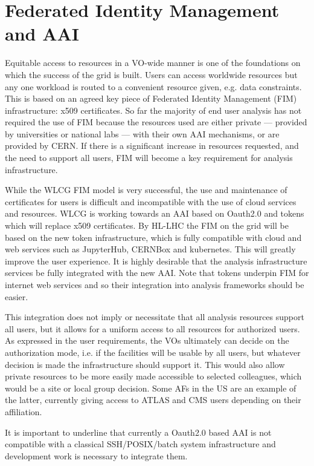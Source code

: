 \section{Federated Identity Management and AAI}
\label{aai}

Equitable access to resources in a VO-wide manner is one of the foundations on which the success of the grid is built. Users can access worldwide resources but any one workload is routed to a convenient resource given, e.g. data constraints. This is based on an agreed key piece of Federated Identity Management (FIM) infrastructure: x509 certificates. So far the majority of end user analysis has not required the use of FIM because the resources used are either private ---  provided by universities or national labs --- with their own AAI mechanisms, or are provided by CERN. If there is a significant increase in resources requested, and the need to support all users, FIM will become a key requirement for analysis infrastructure. 

While the WLCG FIM model is very successful, the use and maintenance of certificates for users is difficult and incompatible with the use of cloud services and resources. WLCG is working towards an AAI based on Oauth2.0 and tokens which will replace x509 certificates. By HL-LHC the FIM on the grid will be based on the new token infrastructure, which is fully compatible with cloud and web services such as JupyterHub, CERNBox and kubernetes. This will greatly improve the user experience.  It is highly desirable that the analysis infrastructure services be fully integrated with the new AAI. Note that tokens underpin FIM for internet web services and so their integration into analysis frameworks should be easier.

This integration does not imply or necessitate that all analysis resources support all users, but it allows for a uniform access to all resources for authorized users. As expressed in the user requirements, the VOs ultimately can decide on the authorization mode, i.e. if the facilities will be usable by all users, but whatever decision is made the infrastructure should support it. This would also allow private resources to be more easily made accessible to selected colleagues, which would be a site or local group decision. Some AFs in the US are an example of the latter, currently giving access to ATLAS and CMS users depending on their affiliation.

It is important to underline that currently a Oauth2.0 based AAI is not compatible with a classical SSH/POSIX/batch system infrastructure and development work is necessary to integrate them.




